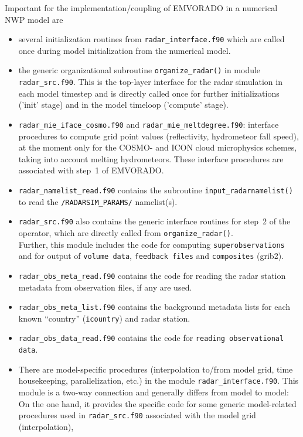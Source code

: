 \documentclass[10pt,a4paper,twoside,headinclude,footinclude,parskip=half]{scrartcl}
\newcommand{\srcform}[1]{\mbox{\texttt{#1}}\xspace}%
\begin{document}
Important for the implementation/coupling of EMVORADO in a numerical NWP model are
\begin{itemize}
\item several initialization routines from \srcform{radar_interface.f90} which are called once during model initialization from
  the numerical model.
\item the generic organizational subroutine \srcform{organize_radar()} in module \srcform{radar_src.f90}. This is the
  top-layer interface for the radar simulation in each model timestep and is directly called once for further initializations ('init' stage) and in the model timeloop ('compute' stage).
\item \srcform{radar_mie_iface_cosmo.f90} and \srcform{radar_mie_meltdegree.f90}: interface procedures
  to compute grid point values (reflectivity, hydrometeor fall speed), at the moment only for
  the COSMO- and ICON cloud microphysics schemes, taking into account melting hydrometeors.
  These interface procedures are associated with step~1 of EMVORADO.
\item \srcform{radar_namelist_read.f90} contains the subroutine \srcform{input_radarnamelist()} to
  read the \srcform{/RADARSIM_PARAMS/} namelist(s).
\item \srcform{radar_src.f90} also contains the generic interface routines for step~2 of the operator, which
  are directly called from \srcform{organize_radar()}.\\
  Further, this module includes the code for computing \srcform{superobservations}
  and for output of \srcform{volume data}, \srcform{feedback files} and \srcform{composites} (grib2).
\item \srcform{radar_obs_meta_read.f90} contains the code for reading the radar station metadata from observation files, if any are used.
\item \srcform{radar_obs_meta_list.f90} contains the background metadata lists for each known
  ``country'' (\srcform{icountry}) and radar station.
\item \srcform{radar_obs_data_read.f90} contains the code for \srcform{reading observational data}.
\item There are model-specific procedures (interpolation to/from model grid, time housekeeping, parallelization, etc.)
  in the module \srcform{radar_interface.f90}.
  This module is a two-way connection and generally differs from model to model:
  On the one hand, it provides the specific code for some generic
  model-related procedures used in \srcform{radar_src.f90} associated with the model grid (interpolation),

\end{itemize}
\end{document}
